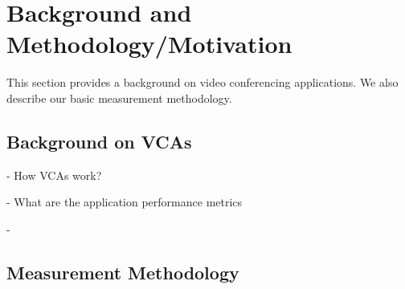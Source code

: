 \section{Background and Methodology/Motivation}
\label{sec:background}
This section provides a background on video conferencing applications. We also describe our basic measurement methodology.

\subsection{Background on VCAs}
- How VCAs work?

- What are the application performance metrics 

- 


\subsection{Measurement Methodology}
  

